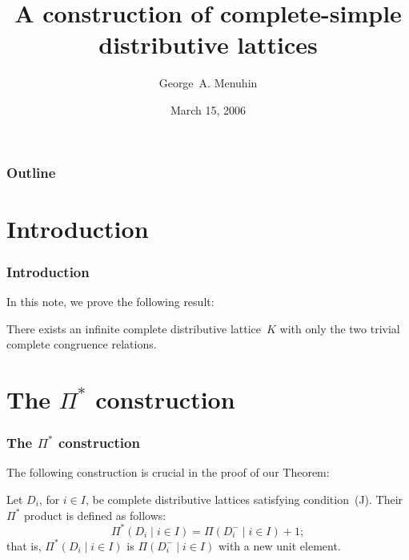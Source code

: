 \documentclass{beamer}
\begin{document}
\title[Complete-simple distributive lattices]{A construction of complete-simple\\ distributive lattices}
\author[]{George~A. Menuhin}
\date{March 15, 2006}

\begin{frame}
\titlepage
\end{frame}

\begin{frame}
\frametitle{Outline}

\tableofcontents[pausesections]
\end{frame}

\section{Introduction}

\begin{frame}
\frametitle{Introduction}

In this note, we prove the following result:

\begin{theorem} 
There exists an infinite complete distributive 
lattice~$K$ with only the two trivial complete 
congruence relations.
\end{theorem}
\end{frame}

\section[Construction]{The $\Pi^{*}$ construction}

\begin{frame}
\frametitle{The $\Pi^{*}$ construction}

The following construction is crucial in the proof
of our Theorem:

\begin{definition} 
Let $D_{i}$, for $i \in I$, be complete distributive 
lattices satisfying condition~\textup{(J)}.  Their 
$\Pi^{*}$ product is defined as follows:
\[
   \Pi^{*} ( D_{i} \mid i \in I ) = 
   \Pi ( D_{i}^{-} \mid i \in I ) + 1;
\]
that is, $\Pi^{*} ( D_{i} \mid i \in I )$ is 
$\Pi ( D_{i}^{-} \mid i \in I )$ with a new 
unit element. 
\end{definition}
\end{frame}
\end{document}
